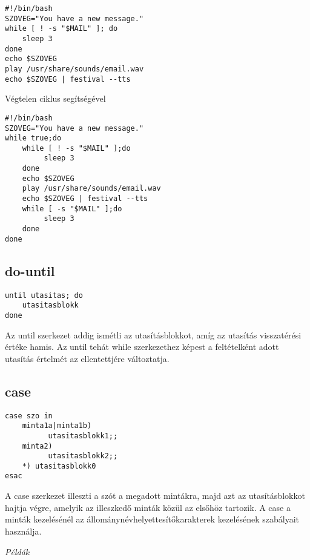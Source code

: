 \begin{lstlisting}
#!/bin/bash
SZOVEG="You have a new message."
while [ ! -s "$MAIL" ]; do
    sleep 3
done
echo $SZOVEG
play /usr/share/sounds/email.wav
echo $SZOVEG | festival --tts
\end{lstlisting}

Végtelen ciklus segítségével
\begin{lstlisting}
#!/bin/bash
SZOVEG="You have a new message."
while true;do
    while [ ! -s "$MAIL" ];do
         sleep 3
    done
    echo $SZOVEG
    play /usr/share/sounds/email.wav
    echo $SZOVEG | festival --tts
    while [ -s "$MAIL" ];do
         sleep 3
    done
done
\end{lstlisting}


\subsection{do-until}
\begin{lstlisting}
until utasitas; do	
    utasitasblokk
done
\end{lstlisting}

Az until szerkezet addig ismétli az utasításblokkot, amíg az utasítás visszatérési értéke hamis. 
Az until tehát while szerkezethez képest a feltételként adott utasítás értelmét az ellentettjére változtatja.

\vfill\pagebreak
\subsection{case}
 \begin{lstlisting}
case szo in
    minta1a|minta1b)
          utasitasblokk1;;
    minta2)
          utasitasblokk2;;
    *) utasitasblokk0
esac
 \end{lstlisting}

A case szerkezet illeszti a szót a megadott mintákra, majd azt az utasításblokkot hajtja végre,
amelyik az illeszkedő minták közül az elsőhöz tartozik. A case a minták kezelésénél az
állománynévhelyettesítőkarakterek kezelésének szabályait használja.
\bigskip

\emph{Példák}

